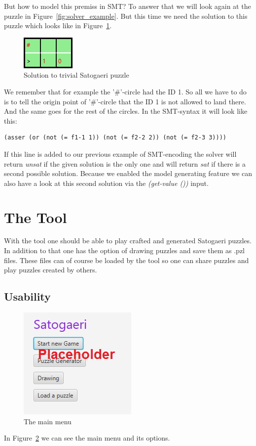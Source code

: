 \documentclass[a4paper,10pt]{paper}
\begin{document}
But how to model this premiss in SMT? To answer that we will look again at the puzzle in Figure~\ref{fig:solver_example}. But this time we need the solution to this puzzle which looks like in Figure~\ref{fig:solver_example_solution}.
\begin{figure}
  \centering
  \includegraphics[scale=1]{Pictures/solver_example_solution.png} 
  \caption{Solution to trivial Satogaeri puzzle}
  \label{fig:solver_example_solution}
\end{figure}
We remember that for example the '\#'-circle had the ID 1. So all we have to do is to tell the origin point of '\#'-circle that the ID 1 is not allowed to land there. And the same goes for the rest of the circles. In the SMT-syntax it will look like this:
\begin{lstlisting}
(asser (or (not (= f1-1 1)) (not (= f2-2 2)) (not (= f2-3 3))))
\end{lstlisting}
If this line is added to our previous example of SMT-encoding the solver will return \emph{unsat} if the given solution is the only one and will return \emph{sat} if there is a second possible solution. Because we enabled the model generating feature we can also have a look at this second solution via the \emph{(get-value ())} input.

\section{The Tool}
With the tool one should be able to play crafted and generated Satogaeri puzzles. In addition to that one has the option of drawing puzzles and save them as .pzl files. These files can of course be loaded by the tool so one can share puzzles and play puzzles created by others.

\subsection{Usability}
\begin{figure}
  \centering
  \includegraphics[scale=1]{Pictures/main_menu.png} 
  \caption{The main menu}
  \label{fig:main_menu}
\end{figure}
In Figure~\ref{fig:main_menu} we can see the main menu and its options.
\end{document}
